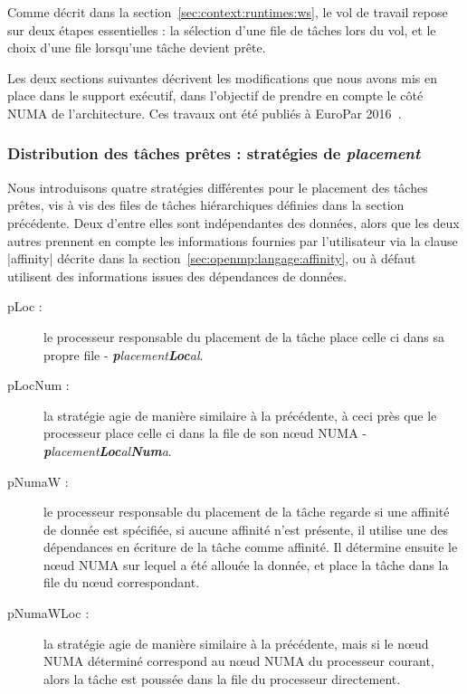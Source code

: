 Comme décrit dans la section~\ref{sec:context:runtimes:ws}, le vol de travail repose sur deux étapes essentielles : la sélection d'une file de tâches lors du vol, et le choix d'une file lorsqu'une tâche devient prête.

Les deux sections suivantes décrivent les modifications que nous avons mis en place dans le support exécutif, dans l'objectif de prendre en compte le côté NUMA de l'architecture.
Ces travaux ont été publiés à EuroPar 2016~\cite{Virouleau2016b}.


\subsubsection{Distribution des tâches prêtes : stratégies de \emph{placement}}
\label{sec:openmp:runtime:push}

Nous introduisons quatre stratégies différentes pour le placement des tâches prêtes, vis à vis des files de tâches hiérarchiques définies dans la section précédente.
Deux d'entre elles sont indépendantes des données, alors que les deux autres prennent en compte les informations fournies par l'utilisateur via la clause |affinity| décrite dans la section~\ref{sec:openmp:langage:affinity}, ou à défaut utilisent des informations issues des dépendances de données.

\begin{description}
  \item [pLoc :] le processeur responsable du placement de la tâche place celle ci dans sa propre file - \emph{\textbf{p}lacement\textbf{Loc}al}.
  \item [pLocNum :] la stratégie agie de manière similaire à la précédente, à ceci près que le processeur place celle ci dans la file de son nœud NUMA - \emph{\textbf{p}lacement\textbf{Loc}al\textbf{Num}a}.
  \item [pNumaW :] le processeur responsable du placement de la tâche regarde si une affinité de donnée est spécifiée, si aucune affinité n'est présente, il utilise une des dépendances en écriture de la tâche comme affinité.
Il détermine ensuite le nœud NUMA sur lequel a été allouée la donnée, et place la tâche dans la file du nœud correspondant.
  \item [pNumaWLoc :] la stratégie agie de manière similaire à la précédente, mais si le nœud NUMA déterminé correspond au nœud NUMA du processeur courant, alors la tâche est poussée dans la file du processeur directement.
\end{description}

